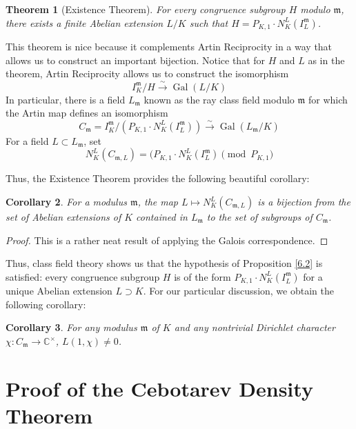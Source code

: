 \documentclass{article}
\DeclareMathOperator{\Gal}{Gal}
\newcommand{\CC}{\mathbb{C}}
\theoremstyle{plain}
\newtheorem{thm}{Theorem}
\newtheorem{cor}[thm]{Corollary}
\theoremstyle{definition}
\theoremstyle{remark}
\numberwithin{equation}{section}
\numberwithin{thm}{section}
\begin{document}
\begin{thm}[Existence Theorem]
For every congruence subgroup $H$ modulo $\mathfrak{m}$, there exists a finite Abelian extension $L/K$ such that $H = P_{K, 1} \cdot N_{K}^{L}(I_{L}^{\mathfrak{m}})$.
\end{thm}

This theorem is nice because it complements Artin Reciprocity in a way that allows us to construct an important bijection. Notice that for $H$ and $L$ as in the theorem, Artin Reciprocity allows us to construct the isomorphism $$I_{K}^{\mathfrak{m}}/H \xrightarrow{\sim} \Gal(L/K)$$ In particular, there is a field $L_{\mathfrak{m}}$ known as the ray class field modulo $\mathfrak{m}$ for which the Artin map defines an isomorphism $$C_{\mathfrak{m}} = I_{K}^{\mathfrak{m}}/(P_{K,1}\cdot N_{K}^{L}(I_{L}^{\mathfrak{m}})) \xrightarrow{\sim} \Gal(L_{\mathfrak{m}}/K)$$ For a field $L \subset L_{\mathfrak{m}}$, set $$N_{K}^{L}(C_{\mathfrak{m}, L}) = (P_{K,1}\cdot N_{K}^{L}(I_{L}^{\mathfrak{m}}) \pmod{P_{K, 1}}$$

Thus, the Existence Theorem provides the following beautiful corollary:

\begin{cor}
For a modulus $\mathfrak{m}$, the map $L \mapsto N_{K}^{L}(C_{\mathfrak{m}, L})$ is a bijection from the set of Abelian extensions of $K$ contained in $L_{\mathfrak{m}}$ to the set of subgroups of $C_{\mathfrak{m}}$.
\end{cor}

\begin{proof}
This is a rather neat result of applying the Galois correspondence. 
\end{proof}

Thus, class field theory shows us that the hypothesis of Proposition \ref{6.2} is satisfied: every congruence subgroup $H$ is of the form $P_{K, 1} \cdot N_{K}^{L}(I_{L}^{\mathfrak{m}})$ for a unique Abelian extension $L \supset K$. For our particular discussion, we obtain the following corollary:

\begin{cor} \label{6.7}
For any modulus $\mathfrak{m}$ of $K$ and any nontrivial Dirichlet character $\chi : C_{\mathfrak{m}} \longrightarrow \CC^{\times}$, $L(1, \chi) \neq 0$.
\end{cor}

\section{Proof of the Cebotarev Density Theorem}
\end{document}
